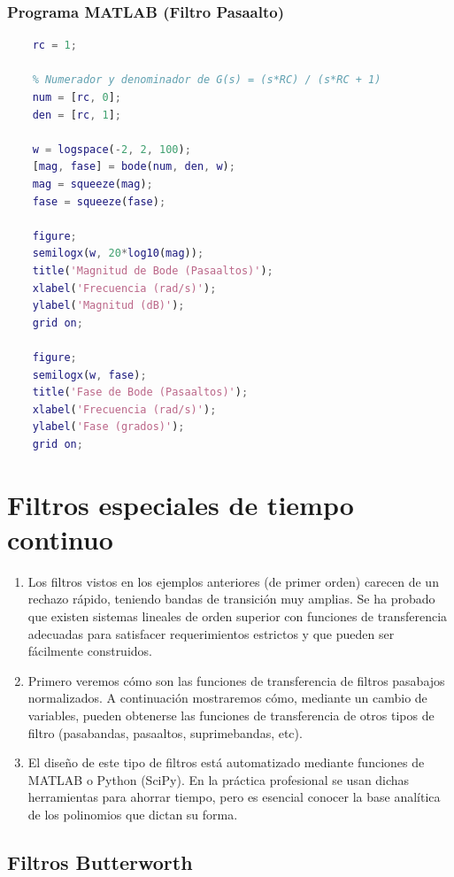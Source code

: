 \subsubsection{Programa MATLAB (Filtro Pasaalto)}

\begin{lstlisting}[language=Matlab]
	% Constante RC = 1
	rc = 1;
	
	% Numerador y denominador de G(s) = (s*RC) / (s*RC + 1)
	num = [rc, 0];
	den = [rc, 1];
	
	w = logspace(-2, 2, 100);
	[mag, fase] = bode(num, den, w);
	mag = squeeze(mag);
	fase = squeeze(fase);
	
	figure;
	semilogx(w, 20*log10(mag));
	title('Magnitud de Bode (Pasaaltos)');
	xlabel('Frecuencia (rad/s)');
	ylabel('Magnitud (dB)');
	grid on;
	
	figure;
	semilogx(w, fase);
	title('Fase de Bode (Pasaaltos)');
	xlabel('Frecuencia (rad/s)');
	ylabel('Fase (grados)');
	grid on;
\end{lstlisting}

\section{Filtros especiales de tiempo continuo}

\begin{enumerate}
	\item Los filtros vistos en los ejemplos anteriores (de primer orden) carecen de un rechazo rápido, teniendo bandas de transición muy amplias. Se ha probado que existen sistemas lineales de orden superior con funciones de transferencia adecuadas para satisfacer requerimientos estrictos y que pueden ser f\'{a}cilmente construidos.
	\item Primero veremos c\'{o}mo son las funciones de transferencia de filtros pasabajos normalizados. A continuaci\'{o}n mostraremos c\'{o}mo, mediante un cambio de variables, pueden obtenerse las funciones de transferencia de otros tipos de filtro (pasabandas, pasaaltos, suprimebandas, etc).
	\item El dise\~{n}o de este tipo de filtros est\'{a} automatizado mediante funciones de MATLAB o Python (SciPy). En la pr\'{a}ctica profesional se usan dichas herramientas para ahorrar tiempo, pero es esencial conocer la base analítica de los polinomios que dictan su forma.
\end{enumerate}

\subsection{Filtros Butterworth}

